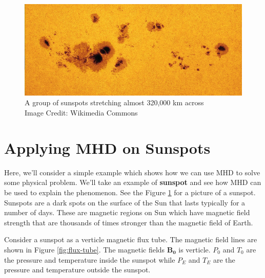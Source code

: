 \documentclass[12pt]{article}
\newenvironment{changemargin}[2]{
\begin{list}{}{
\setlength{\topsep}{0pt}
\setlength{\leftmargin}{#1}
\setlength{\rightmargin}{#2}
\setlength{\listparindent}{\parindent}
\setlength{\itemindent}{\parindent}
\setlength{\parsep}{\parskip}
}
\item[]}{\end{list}}
\begin{document}
\begin{changemargin}{-2cm}{-2cm}
    \begin{figure}[h]
        \centering
        \includegraphics[width=1.0\textwidth, height=0.5\textwidth]{sunspot.jpg}
        \caption{A group of sunspots stretching almost 320,000 km across\\ Image Credit: Wikimedia Commons}
        \label{fig:sunspot}
    \end{figure}
    \section{Applying MHD on Sunspots}
    Here, we'll consider a simple example which shows how we can use MHD to solve some physical problem. We'll take an example of \textbf{sunspot} and see how MHD can be used to explain the phenomenon. See the Figure \ref{fig:sunspot} for a picture of a sunspot. Sunspots are a dark spots on the surface of the Sun that lasts typically for a number of days. These are magnetic regions on Sun which have magnetic field strength that are thousands of times stronger than the magnetic field of Earth.

    Consider a sunspot as a verticle magnetic flux tube. The magnetic field lines are shown in Figure \ref{fig:flux-tube}. The magnetic fields $\mathbf{B_0}$ is verticle. $P_0$ and $T_0$ are the pressure and temperature inside the sunspot while $P_{E}$ and $T_{E}$ are the pressure and temperature outside the sunspot.\cite{article2}


\end{changemargin}
\end{document}
